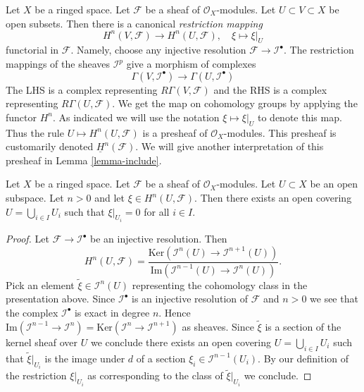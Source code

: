\noindent
Let $X$ be a ringed space.
Let $\mathcal{F}$ be a sheaf of $\mathcal{O}_X$-modules.
Let $U \subset V \subset X$ be open subsets.
Then there is a canonical {\it restriction mapping}
\begin{equation}
\label{equation-restriction-mapping}
H^n(V, \mathcal{F})
\longrightarrow
H^n(U, \mathcal{F}), \quad
\xi \longmapsto \xi|_U
\end{equation}
functorial in $\mathcal{F}$. Namely, choose any injective
resolution $\mathcal{F} \to \mathcal{I}^\bullet$. The restriction
mappings of the sheaves $\mathcal{I}^p$ give a morphism of complexes
$$
\Gamma(V, \mathcal{I}^\bullet)
\longrightarrow
\Gamma(U, \mathcal{I}^\bullet)
$$
The LHS is a complex representing $R\Gamma(V, \mathcal{F})$
and the RHS is a complex representing $R\Gamma(U, \mathcal{F})$.
We get the map on cohomology groups by applying the functor $H^n$.
As indicated we will use the notation $\xi \mapsto \xi|_U$ to denote this map.
Thus the rule $U \mapsto H^n(U, \mathcal{F})$ is a presheaf of
$\mathcal{O}_X$-modules. This presheaf is customarily denoted
$\underline{H}^n(\mathcal{F})$. We will give another interpretation 
of this presheaf in Lemma \ref{lemma-include}.

\begin{lemma}
\label{lemma-kill-cohomology-class-on-covering}
Let $X$ be a ringed space.
Let $\mathcal{F}$ be a sheaf of $\mathcal{O}_X$-modules.
Let $U \subset X$ be an open subspace.
Let $n > 0$ and let $\xi \in H^n(U, \mathcal{F})$.
Then there exists an open covering
$U = \bigcup_{i\in I} U_i$ such that $\xi|_{U_i} = 0$ for
all $i \in I$.
\end{lemma}

\begin{proof}
Let $\mathcal{F} \to \mathcal{I}^\bullet$ be an injective resolution.
Then
$$
H^n(U, \mathcal{F}) = 
\frac{\text{Ker}(\mathcal{I}^n(U) \to \mathcal{I}^{n + 1}(U))}
{\text{Im}(\mathcal{I}^{n - 1}(U) \to \mathcal{I}^n(U))}.
$$
Pick an element $\tilde \xi \in \mathcal{I}^n(U)$ representing the
cohomology class in the presentation above. Since $\mathcal{I}^\bullet$
is an injective resolution of $\mathcal{F}$ and $n > 0$ we see that
the complex $\mathcal{I}^\bullet$ is exact in degree $n$. Hence
$\text{Im}(\mathcal{I}^{n - 1} \to \mathcal{I}^n) =
\text{Ker}(\mathcal{I}^n \to \mathcal{I}^{n + 1})$ as sheaves.
Since $\tilde \xi$ is a section of the kernel sheaf over $U$
we conclude there exists an open covering $U = \bigcup_{i \in I} U_i$
such that $\tilde \xi|_{U_i}$ is the image under $d$ of a section
$\xi_i \in \mathcal{I}^{n - 1}(U_i)$. By our definition of the
restriction $\xi|_{U_i}$ as corresponding to the class of
$\tilde \xi|_{U_i}$ we conclude.
\end{proof}

